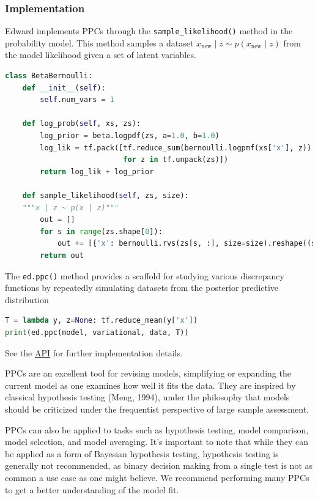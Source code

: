\subsubsection{Implementation}

Edward implements PPCs through the \texttt{sample_likelihood()}
method in the probability model. This method samples a dataset
$x_{\text{new}}\mid z\sim p(x_{\text{new}}\mid z)$ from the
model likelihood given a set of latent variables.
\begin{lstlisting}[language=Python]
class BetaBernoulli:
    def __init__(self):
        self.num_vars = 1

    def log_prob(self, xs, zs):
        log_prior = beta.logpdf(zs, a=1.0, b=1.0)
        log_lik = tf.pack([tf.reduce_sum(bernoulli.logpmf(xs['x'], z))
                           for z in tf.unpack(zs)])
        return log_lik + log_prior

    def sample_likelihood(self, zs, size):
    """x | z ~ p(x | z)"""
        out = []
        for s in range(zs.shape[0]):
            out += [{'x': bernoulli.rvs(zs[s, :], size=size).reshape((size,))}]
        return out
\end{lstlisting}

The \texttt{ed.ppc()} method provides a scaffold for studying
various discrepancy functions by repeatedly simulating datasets from the
posterior predictive distribution
\begin{lstlisting}[language=Python]
T = lambda y, z=None: tf.reduce_mean(y['x'])
print(ed.ppc(model, variational, data, T))
\end{lstlisting}

See the \href{api/index.html}{API} for further implementation details.

PPCs are an excellent tool for revising models, simplifying or
expanding the current model as one examines how well it fits the data.
They are inspired by classical hypothesis testing (Meng, 1994),
under the philosophy that models should be criticized under the
frequentist perspective of large sample assessment.

PPCs can also be applied to tasks such as hypothesis testing, model
comparison, model selection, and model averaging.  It's important to
note that while they can be applied as a form of Bayesian hypothesis
testing, hypothesis testing is generally not recommended, as binary
decision making from a single test is not as common a use case as one
might believe. We recommend performing many PPCs to get a better
understanding of the model fit.

